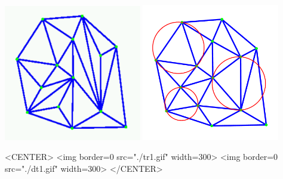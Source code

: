 \newcommand{\triangulationcomment}[1]{}


\begin{ccTexOnly}
\begin{center}
\includegraphics[width=6cm]{Triangulation_2/tr1} \hspace*{1cm} 
\includegraphics[width=6cm]{Triangulation_2/dt1} 
\end{center}
\end{ccTexOnly}
\begin{ccHtmlOnly}
<CENTER>
<img border=0 src="./tr1.gif" width=300>
<img border=0 src="./dt1.gif" width=300>
</CENTER>
\end{ccHtmlOnly}

